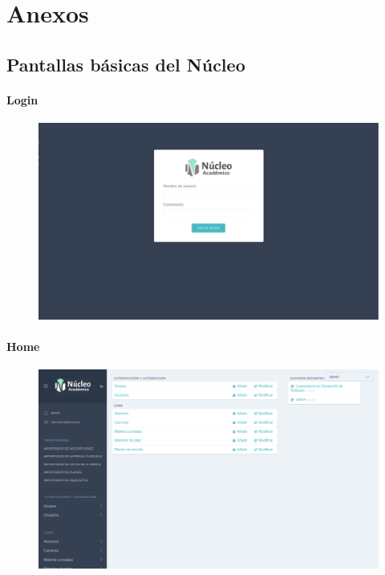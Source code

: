 \chapter{Anexos}

\section{Pantallas básicas del Núcleo}


\subsubsection{Login}
\begin{figure}[!htbp]
  \centering
    \includegraphics[scale=0.3]{images/nucleo/nucleo-login.png}
  \label{fig:nucleo-login}
\end{figure}

\subsubsection{Home}
\begin{figure}[!htbp]
  \centering
    \includegraphics[scale=0.3]{images/nucleo/nucleo-home.png}
  \label{fig:nucleo-home}
\end{figure}

